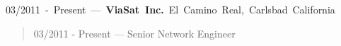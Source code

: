 \mbox{03/2011 - Present --- {\bf ViaSat Inc.} El Camino Real, Carlsbad California }
\begin{quote}
03/2011 - Present --- Senior Network Engineer\\

\end{quote}
